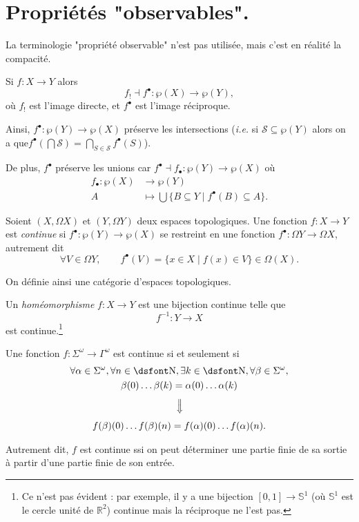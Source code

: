\documentclass[./main]{subfiles}
\begin{document}

  \chapter{Propriétés "observables".}

  La terminologie "propriété observable" n'est pas utilisée, mais c'est en réalité la compacité.

  \begin{rmk}[Rappel]
    Si $f : X \to Y$ alors  \[
    f_! \dashv f^\bullet: \wp(X) \to \wp(Y)
    ,\]
    où $f_!$ est l'image directe, et $f^\bullet$ est l'image réciproque.

    Ainsi, $f^\bullet : \wp(Y) \to \wp(X)$  préserve les intersections (\textit{i.e.} si $\mathcal{S}\subseteq \wp(Y)$ alors on a que$f^\bullet (\bigcap \mathcal{S}) = \bigcap_{S \in \mathcal{S}}  f^\bullet(S)$).

    De plus, $f^\bullet$ préserve les unions car $f^\bullet \dashv f_\bullet : \wp(Y) \to \wp(X)$ où
     \begin{align*}
      f_\bullet: \wp(X) &\longrightarrow \wp(Y) \\
      A &\longmapsto \bigcup \{B \subseteq Y  \mid f^\bullet(B) \subseteq A\} 
    .\end{align*}
  \end{rmk}

  \begin{defn}
    Soient $(X, \Omega X)$ et $(Y, \Omega Y)$ deux espaces topologiques.
    Une fonction $f : X \to Y$ est \textit{continue} si $f^\bullet : \wp(Y) \to \wp(X)$ se restreint en une fonction $f^\bullet : \Omega Y \to \Omega X$, autrement dit 
    \[
    \forall  V \in \Omega Y, \quad\quad f^\bullet(V) = \{x \in X  \mid f(x) \in V\}  \in \Omega(X)
    .\]

    On définie ainsi une catégorie d'espaces topologiques.

    Un \textit{homéomorphisme} $f : X \to Y$ est une bijection continue telle que 
    \[
    f^{-1} : Y \to X
    \]
    est continue.\footnote{Ce n'est pas évident : par exemple, il y a une bijection $[0, 1] \to \mathds S^1$ (où $\mathds S^1$ est le cercle unité de $\mathds{R}^2$) continue mais la réciproque ne l'est pas.}
  \end{defn}

  \begin{lem}
    Une fonction $f : \Sigma^\omega \to \Gamma^\omega$ est continue si et seulement si
    \begin{gather*}
    \forall \alpha \in \Sigma^\omega, \forall n \in \mathds{N},
    \exists k \in \mathds{N}, \forall \beta \in \Sigma^\omega,\\
    \beta(0)\ldots\beta(k) = \alpha(0)\ldots\alpha(k)\\
    \vertical\implies\\
    f(\beta)(0) \ldots f(\beta)(n) = f(\alpha)(0) \ldots f(\alpha)(n)
    .\end{gather*}

    Autrement dit, $f$ est continue ssi on peut déterminer une partie finie de sa sortie à partir d'une partie finie de son entrée.
  \end{lem}
\end{document}

